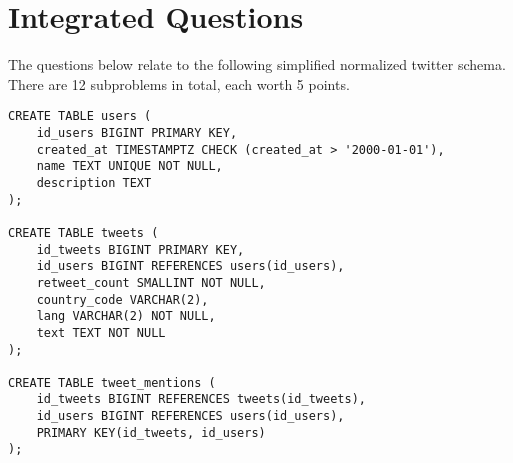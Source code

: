 \documentclass[12pt]{exam}
\theoremstyle{definition}
\begin{document}
\newpage
\section{Integrated Questions}

The questions below relate to the following simplified normalized twitter schema.
There are 12 subproblems in total, each worth 5 points.

\begin{lstlisting}
CREATE TABLE users (
    id_users BIGINT PRIMARY KEY,
    created_at TIMESTAMPTZ CHECK (created_at > '2000-01-01'),
    name TEXT UNIQUE NOT NULL,
    description TEXT
);

CREATE TABLE tweets (
    id_tweets BIGINT PRIMARY KEY,
    id_users BIGINT REFERENCES users(id_users),
    retweet_count SMALLINT NOT NULL,
    country_code VARCHAR(2),
    lang VARCHAR(2) NOT NULL,
    text TEXT NOT NULL
);

CREATE TABLE tweet_mentions (
    id_tweets BIGINT REFERENCES tweets(id_tweets),
    id_users BIGINT REFERENCES users(id_users),
    PRIMARY KEY(id_tweets, id_users)
);
\end{lstlisting}
\end{document}
